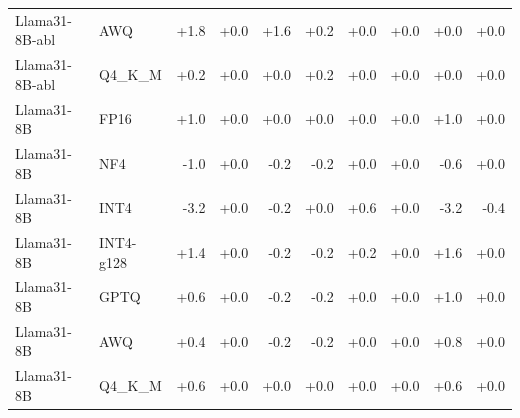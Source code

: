 \begin{tabular}{@{}l l r r r r r r r r @{}}
Llama31-8B-abl & AWQ & +1.8 & +0.0 & +1.6 & +0.2 & +0.0 & +0.0 & +0.0 & +0.0 \\
Llama31-8B-abl & Q4_K_M & +0.2 & +0.0 & +0.0 & +0.2 & +0.0 & +0.0 & +0.0 & +0.0 \\
Llama31-8B & FP16 & +1.0 & +0.0 & +0.0 & +0.0 & +0.0 & +0.0 & +1.0 & +0.0 \\
Llama31-8B & NF4 & -1.0 & +0.0 & -0.2 & -0.2 & +0.0 & +0.0 & -0.6 & +0.0 \\
Llama31-8B & INT4 & -3.2 & +0.0 & -0.2 & +0.0 & +0.6 & +0.0 & -3.2 & -0.4 \\
Llama31-8B & INT4-g128 & +1.4 & +0.0 & -0.2 & -0.2 & +0.2 & +0.0 & +1.6 & +0.0 \\
Llama31-8B & GPTQ & +0.6 & +0.0 & -0.2 & -0.2 & +0.0 & +0.0 & +1.0 & +0.0 \\
Llama31-8B & AWQ & +0.4 & +0.0 & -0.2 & -0.2 & +0.0 & +0.0 & +0.8 & +0.0 \\
Llama31-8B & Q4_K_M & +0.6 & +0.0 & +0.0 & +0.0 & +0.0 & +0.0 & +0.6 & +0.0 \\
\bottomrule
\end{tabular}
